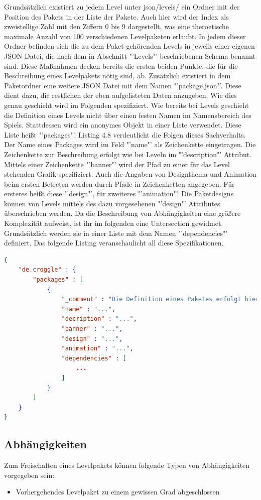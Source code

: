 Grundsätzlich existiert zu jedem Level unter json/levels/ ein Ordner mit der Position des Pakets in der Liste der Pakete.
Auch hier wird der Index als zweistellige Zahl mit den Ziffern 0 bis 9 dargestellt, was eine theroetische maximale Anzahl von 100 verschiedenen Levelpaketen erlaubt.
In jedem dieser Ordner befinden sich die zu dem Paket gehörenden Levels in jeweils einer eigenen JSON Datei, die nach dem in Abschnitt "'Levels"' beschriebenen Schema benannt sind.
Diese Maßnahmen decken bereits die ersten beiden Punkte, die für die Beschreibung eines Levelpakets nötig sind, ab.
Zusätzlich existiert in dem Paketordner eine weitere JSON Datei mit dem Namen "'package.json"'.
Diese dient dazu, die restlichen der eben aufgelisteten Daten anzugeben.
Wie dies genau geschieht wird im Folgenden spezifiziert.
\newline
Wie bereits bei Levels geschieht die Definition eines Levels nicht über einen festen Namen im Namensbereich des Spiels.
Stattdessen wird ein anonymes Objekt in einer Liste verwendet.
Diese Liste heißt "'packages"'.
Listing 4.8 verdeutlicht die Folgen dieses Sachverhalts.
Der Name eines Packages wird im Feld "'name"' als Zeichenkette eingetragen.
Die Zeichenkette zur Beschreibung erfolgt wie bei Leveln im "'description"' Attribut.
Mittels einer Zeichenkette "'banner"' wird der Pfad zu einer für das Level stehenden Grafik spezifiziert.
Auch die Angaben von Designthema und Animation beim ersten Betreten werden durch Pfade in Zeichenketten angegeben.
Für ersteres heißt diese "'design"', für zweiteres "'animation"'.
Die Paketdesigns können von Levels mittels des dazu vorgesehenen "'design"' Attributes überschrieben werden.
Da die Beschreibung von Abhängigkeiten eine größere Komplexität aufweist, ist ihr im folgenden eine Untersection gewidmet.
Grundsätzlich werden sie in einer Liste mit dem Namen "'dependencies"' definiert.
Das folgende Listing veranschaulicht all diese Spezifikationen.
\begin{lstlisting}[language=json,caption={Standardinhalt der Definition eines Levels}]
{
	"de.croggle" : {
		"packages" : [
			{
				"_comment" : "Die Definition eines Paketes erfolgt hier",
				"name" : "...",
				"decription" : "...",
				"banner" : "...",
				"design" : "...",
				"animation" : "...",
				"dependencies" : [
					...
				]
			}
		]
	}
}
\end{lstlisting}

\subsection{Abhängigkeiten}
Zum Freischalten eines Levelpakets können folgende Typen von Abhängigkeiten vorgegeben sein:
\begin{itemize}
	\item Vorhergehendes Levelpaket zu einem gewissen Grad abgeschlossen
\end{itemize}

